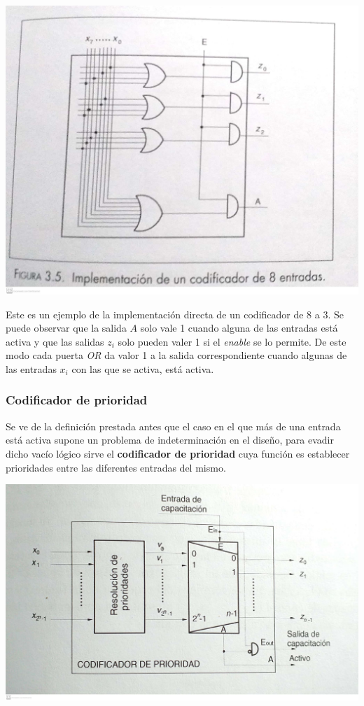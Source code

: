 \documentclass[a4paper,10pt]{book}
\begin{document}
\begin{center}
\includegraphics[scale=0.12]{codificador tripas}
\end{center}

Este es un ejemplo de la implementación directa de un codificador de 8 a 3. Se puede observar que la salida $A$ solo vale 1 cuando alguna de las entradas está activa y que las salidas $z_i$ solo pueden valer 1 si el \textit{enable} se lo permite. De este modo cada puerta \textit{OR} da valor 1 a la salida correspondiente cuando algunas de las entradas $x_i$ con las que se activa, está activa.

\subsubsection*{Codificador de prioridad}
Se ve de la definición prestada antes que el caso en el que más de una entrada está activa supone un problema de indeterminación en el diseño, para evadir dicho vacío lógico sirve el \textbf{codificador de prioridad} cuya función es establecer prioridades entre las diferentes entradas del mismo.

\begin{center}
\includegraphics[scale=0.23]{codificador de prioridad}
\end{center}
\end{document}
